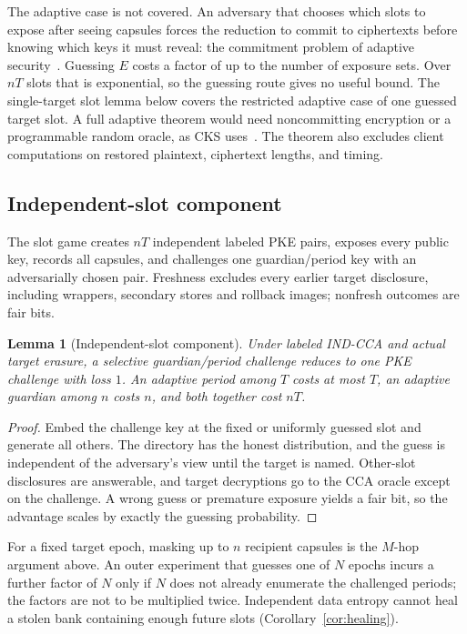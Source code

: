 \documentclass[pdflatex,sn-mathphys-num]{sn-jnl}
\theoremstyle{plain}
\newtheorem{lemma}[theorem]{Lemma}
\theoremstyle{definition}
\begin{document}
The adaptive case is not covered. An adversary that chooses which slots to expose after seeing capsules forces the reduction to commit to ciphertexts before knowing which keys it must reveal: the commitment problem of adaptive security~\cite{canetti1996}. Guessing $E$ costs a factor of up to the number of exposure sets. Over $nT$ slots that is exponential, so the guessing route gives no useful bound. The single-target slot lemma below covers the restricted adaptive case of one guessed target slot. A full adaptive theorem would need noncommitting encryption or a programmable random oracle, as CKS uses~\cite{dodis2024}. The theorem also excludes client computations on restored plaintext, ciphertext lengths, and timing.

\subsection{Independent-slot component}\label{sec:slots}
The slot game creates $nT$ independent labeled PKE pairs, exposes every public key, records all capsules, and challenges one guardian/period key with an adversarially chosen pair. Freshness excludes every earlier target disclosure, including wrappers, secondary stores and rollback images; nonfresh outcomes are fair bits.

\begin{lemma}[Independent-slot component]\label{lem:slot}
Under labeled IND-CCA and actual target erasure, a selective guardian/period challenge reduces to one PKE challenge with loss $1$. An adaptive period among $T$ costs at most $T$, an adaptive guardian among $n$ costs $n$, and both together cost $nT$.
\end{lemma}
\begin{proof}
Embed the challenge key at the fixed or uniformly guessed slot and generate all others. The directory has the honest distribution, and the guess is independent of the adversary's view until the target is named. Other-slot disclosures are answerable, and target decryptions go to the CCA oracle except on the challenge. A wrong guess or premature exposure yields a fair bit, so the advantage scales by exactly the guessing probability.
\end{proof}

For a fixed target epoch, masking up to $n$ recipient capsules is the $M$-hop argument above. An outer experiment that guesses one of $N$ epochs incurs a further factor of $N$ only if $N$ does not already enumerate the challenged periods; the factors are not to be multiplied twice. Independent data entropy cannot heal a stolen bank containing enough future slots (Corollary~\ref{cor:healing}).
\end{document}
